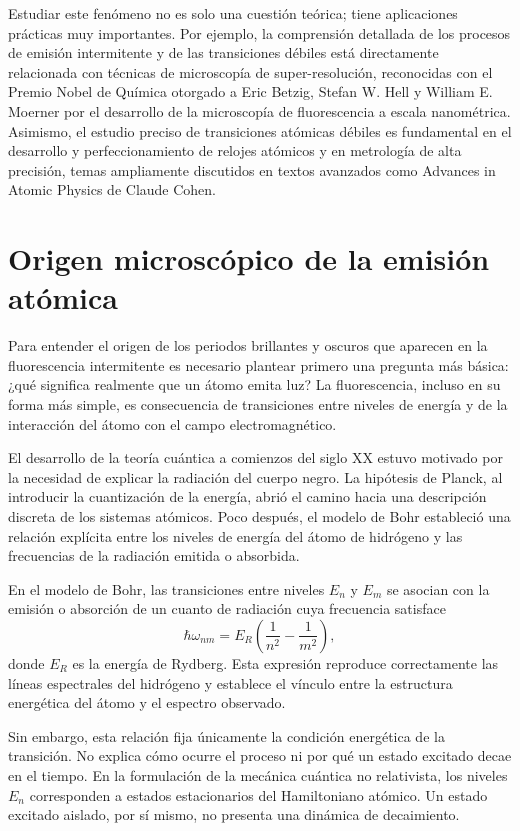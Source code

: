 \documentclass[11pt]{report}
\begin{document}
Estudiar este fenómeno no es solo una cuestión teórica; tiene aplicaciones prácticas muy importantes. Por ejemplo, la comprensión detallada de los procesos de emisión intermitente y de las transiciones débiles está directamente relacionada con técnicas de microscopía de super-resolución, reconocidas con el Premio Nobel de Química otorgado a Eric Betzig, Stefan W. Hell y William E. Moerner por el desarrollo de la microscopía de fluorescencia a escala nanométrica. Asimismo, el estudio preciso de transiciones atómicas débiles es fundamental en el desarrollo y perfeccionamiento de relojes atómicos y en metrología de alta precisión, temas ampliamente discutidos en textos avanzados como Advances in Atomic Physics de Claude Cohen.

\section{Origen microscópico de la emisión atómica}

Para entender el origen de los periodos brillantes y oscuros que aparecen en la fluorescencia intermitente es necesario plantear primero una pregunta más básica: ¿qué significa realmente que un átomo emita luz? La fluorescencia, incluso en su forma más simple, es consecuencia de transiciones entre niveles de energía y de la interacción del átomo con el campo electromagnético.

El desarrollo de la teoría cuántica a comienzos del siglo XX estuvo motivado por la necesidad de explicar la radiación del cuerpo negro. La hipótesis de Planck, al introducir la cuantización de la energía, abrió el camino hacia una descripción discreta de los sistemas atómicos. Poco después, el modelo de Bohr estableció una relación explícita entre los niveles de energía del átomo de hidrógeno y las frecuencias de la radiación emitida o absorbida.

En el modelo de Bohr, las transiciones entre niveles $E_n$ y $E_m$ se asocian con la emisión o absorción de un cuanto de radiación cuya frecuencia satisface
%
\begin{equation}
\hbar \omega_{nm} = E_R \left( \frac{1}{n^2} -  \frac{1}{m^2} \right),
\end{equation}
%
donde $E_R$ es la energía de Rydberg. Esta expresión reproduce correctamente las líneas espectrales del hidrógeno y establece el vínculo entre la estructura energética del átomo y el espectro observado.

Sin embargo, esta relación fija únicamente la condición energética de la transición. No explica cómo ocurre el proceso ni por qué un estado excitado decae en el tiempo. En la formulación de la mecánica cuántica no relativista, los niveles $E_n$ corresponden a estados estacionarios del Hamiltoniano atómico. Un estado excitado aislado, por sí mismo, no presenta una dinámica de decaimiento.
\end{document}

